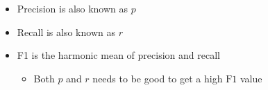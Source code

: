     \begin{itemize}
      \item Precision is also known as $ p $
      \item Recall is also known as $ r $
      \item F1 is the harmonic mean of precision and recall
      \begin{itemize}
        \item Both $ p $ and $ r $ needs to be good to get a high
        $ \text{F1} $ value
      \end{itemize}
    \end{itemize}